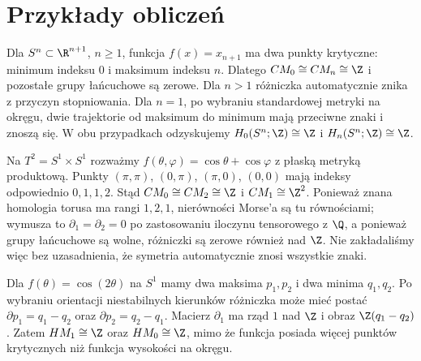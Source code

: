 \section{Przykłady obliczeń}
\begin{przyklad}
Dla $S^n\subset\R^{n+1}$, $n\ge1$, funkcja
$f(x)=x_{n+1}$ ma dwa punkty krytyczne: minimum indeksu $0$
i maksimum indeksu $n$. Dlatego $CM_0\cong CM_n\cong\Z$
i pozostałe grupy łańcuchowe są zerowe.
Dla $n>1$ różniczka automatycznie znika z przyczyn
stopniowania. Dla $n=1$, po wybraniu standardowej metryki
na okręgu, dwie trajektorie od maksimum do minimum
mają przeciwne znaki i znoszą się.
W obu przypadkach odzyskujemy $H_0(S^n;\Z)\cong\Z$
i $H_n(S^n;\Z)\cong\Z$.
\end{przyklad}

\begin{przyklad}
Na $T^2=S^1\times S^1$ rozważmy
$f(\theta,\varphi)=\cos\theta+\cos\varphi$
z płaską metryką produktową. Punkty $(\pi,\pi)$,
$(0,\pi)$, $(\pi,0)$, $(0,0)$ mają indeksy odpowiednio
$0,1,1,2$. Stąd $CM_0\cong CM_2\cong\Z$ i $CM_1\cong\Z^2$.
Ponieważ znana homologia torusa ma rangi $1,2,1$,
nierówności Morse'a są tu równościami; wymusza to
$\partial_1=\partial_2=0$ po zastosowaniu iloczynu tensorowego z $\Q$,
a ponieważ grupy łańcuchowe są wolne, różniczki są zerowe
również nad $\Z$. Nie zakładaliśmy więc bez uzasadnienia,
że symetria automatycznie znosi wszystkie znaki.
\end{przyklad}

\begin{przyklad}
Dla $f(\theta)=\cos(2\theta)$ na $S^1$ mamy dwa maksima
$p_1,p_2$ i dwa minima $q_1,q_2$. Po wybraniu orientacji
niestabilnych kierunków różniczka może mieć postać
$\partial p_1=q_1-q_2$ oraz $\partial p_2=q_2-q_1$.
Macierz $\partial_1$ ma rząd $1$ nad $\Z$ i obraz
$\Z(q_1-q_2)$. Zatem $HM_1\cong\Z$ oraz
$HM_0\cong\Z$, mimo że funkcja posiada więcej punktów
krytycznych niż funkcja wysokości na okręgu.
\end{przyklad}

